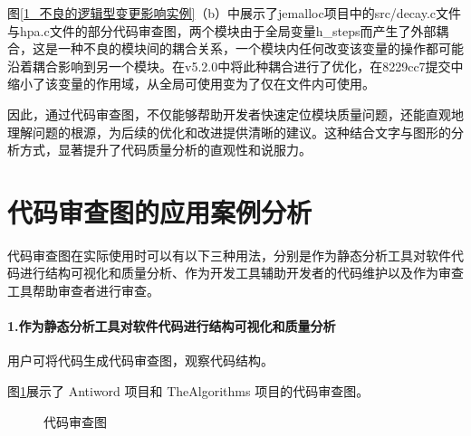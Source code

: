 图\ref{1_不良的逻辑型变更影响实例}（b）中展示了jemalloc项目中的src/decay.c文件与hpa.c文件的部分代码审查图，两个模块由于全局变量h\_steps而产生了外部耦合，这是一种不良的模块间的耦合关系，一个模块内任何改变该变量的操作都可能沿着耦合影响到另一个模块。在v5.2.0中将此种耦合进行了优化，在8229cc7提交中缩小了该变量的作用域，从全局可使用变为了仅在文件内可使用。


因此，通过代码审查图，不仅能够帮助开发者快速定位模块质量问题，还能直观地理解问题的根源，为后续的优化和改进提供清晰的建议。这种结合文字与图形的分析方式，显著提升了代码质量分析的直观性和说服力。


\section{代码审查图的应用案例分析}

代码审查图在实际使用时可以有以下三种用法，分别是作为静态分析工具对软件代码进行结构可视化和质量分析、作为开发工具辅助开发者的代码维护以及作为审查工具帮助审查者进行审查。

\paragraph{1.作为静态分析工具对软件代码进行结构可视化和质量分析} 用户可将代码生成代码审查图，观察代码结构。

图\ref{1_代码审查图}展示了 Antiword 项目和 TheAlgorithms 项目的代码审查图。

\begin{figure}[!h]
    \setlength{\subfigcapskip}{-1bp}
    \centering
    \begin{minipage}{\textwidth}
    \centering
    \hspace{2em}
    \end{minipage}
    \centering
    \begin{minipage}{\textwidth}
    \centering
    \hspace{2em}
    \end{minipage}
    \vspace{0.2em}
    \caption{代码审查图} %
    \label{1_代码审查图}
\end{figure}


